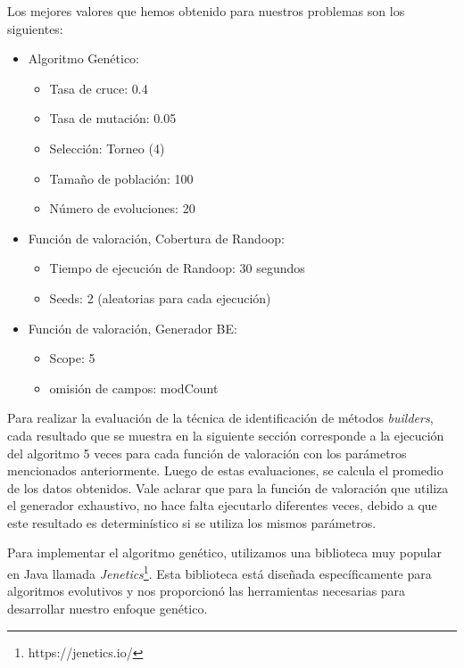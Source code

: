 Los mejores valores que hemos obtenido para nuestros problemas son los siguientes:
\begin{itemize}
    \item Algoritmo Genético:
    \begin{itemize}
        \item Tasa de cruce: 0.4
        \item Tasa de mutación: 0.05
        \item Selección: Torneo (4)
        \item Tamaño de población: 100
        \item Número de evoluciones: 20
    \end{itemize}
    \item Función de valoración, Cobertura de Randoop:
    \begin{itemize}
        \item Tiempo de ejecución de Randoop: 30 segundos
        \item Seeds: 2 (aleatorias para cada ejecución)
    \end{itemize}
     \item Función de valoración, Generador BE:
    \begin{itemize}
        \item Scope: 5
        \item omisión de campos: modCount
    \end{itemize}
\end{itemize}

Para realizar la evaluación de la técnica de identificación de métodos \emph{builders}, cada resultado que se muestra en la siguiente sección corresponde a la ejecución del algoritmo 5 veces para cada función de valoración con los parámetros mencionados anteriormente. Luego de estas evaluaciones, se calcula el promedio de los datos obtenidos.
Vale aclarar que para la función de valoración que utiliza el generador exhaustivo, no hace falta ejecutarlo diferentes veces, debido a que este resultado es determinístico si se utiliza los mismos parámetros.

Para implementar el algoritmo genético, utilizamos una biblioteca muy popular en Java llamada \emph{Jenetics}\footnote{https://jenetics.io/}. Esta biblioteca está diseñada específicamente para algoritmos evolutivos y nos proporcionó las herramientas necesarias para desarrollar nuestro enfoque genético.

